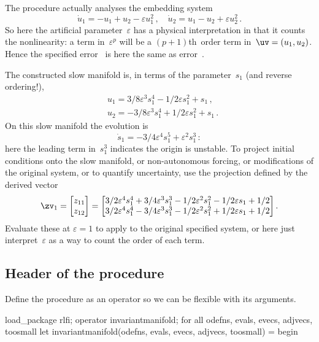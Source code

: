 \documentclass[11pt,a5paper]{article}
\def\eps{\varepsilon}
\begin{document}
The procedure actually analyses the embedding system
\begin{equation*}
\dot u_1=-u_1+u_2-\eps u_1^2\,, \quad \dot u_2=u_1-u_2+\eps u_2^2\,.
\end{equation*}
So here the artificial parameter~\(\eps\) has a physical interpretation in that it counts the nonlinearity: a term in~\(\eps^p\) will be a \((p+1)\)th~order term in~\(\uv=(u_1,u_2)\).
Hence the specified error~\Ord{\eps^5} is here the same as error~.

The constructed slow manifold is, in terms of the parameter~\(s_1\) (and reverse ordering!), 
\begin{align*}&
u_{1}=3/8 \eps^{3} s_{1}^{4}-1/2 \eps s_{1}^{2}+s_{1}\,,
\\&
u_{2}=-3/8 \eps^{3} s_{1}^{4}+1/2 \eps s_{1}^{2}+s_{1}\,.
\end{align*}
On this slow manifold the evolution is
\begin{equation*}
\dot s_{1}=-3/4 \eps^{4} s_{1}^{5}+\eps^{2} s_{1}^{3}\,:
\end{equation*}
here the leading term in~\(s_1^3\) indicates the origin is unstable.
To project initial conditions
onto the slow manifold, or non-autonomous
forcing, or modifications of the original system, or to quantify uncertainty, use the projection defined by the derived vector
\begin{equation*}
\zv_1=\begin{bmatrix}z_{11}\\z_{12}\end{bmatrix}
=\begin{bmatrix}
3/2 \eps^{4} s_{1}^{4}+3/4 \eps^{3} s_{1}^{3}-1/2 \eps^{2} s_{1}
^{2}-1/2 \eps s_{1}+1/2
\\
3/2 \eps^{4} s_{1}^{4}-3/4 \eps^{3} s_{1}^{3}-1/2 \eps^{2} s_{1}
^{2}+1/2 \eps s_{1}+1/2
\end{bmatrix}.
\end{equation*}
Evaluate these at \(\eps=1\) to apply to the original specified system, or here just interpret~\(\eps\) as a way to count the order of each term.




\subsection{Header of the procedure}
Define the procedure as an operator so we can be flexible
with its arguments.
\begin{reduce}
load_package rlfi; %
operator invariantmanifold;
for all odefns, evals, evecs, adjvecs, toosmall 
  let invariantmanifold(odefns, evals, evecs, adjvecs, toosmall) 
  = begin 
\end{reduce}
\end{document}
